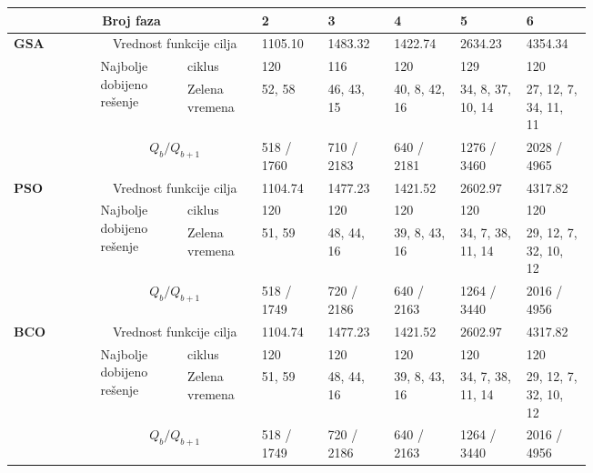 \begin{table*}
    \begin{center}
      \begin{tabular}{p{0.12\linewidth}p{0.12\linewidth}p{0.1\linewidth}p{0.08\linewidth}p{0.08\linewidth}p{0.08\linewidth}p{0.08\linewidth}p{0.08\linewidth}}
        \hline 
        \multicolumn{3}{c}{Broj faza} & 2 & 3 & 4 & 5 & 6 \\ 
        \hline 
        \multirow{4}{4em}{\textbf{GSA}} & \multicolumn{2}{c}{Vrednost funkcije cilja}                    
        & 1105.10 & 1483.32 & 1422.74 & 2634.23 & 4354.34 \\
        \cmidrule{2-8}
        & \multirow{2}{0.9\linewidth}{Najbolje dobijeno rešenje} & ciklus 
        & 120 & 116 & 120 & 129 & 120 \\
                               \cmidrule{3-8}
                               &  & Zelena vremena   
        &  52, 58 &   46, 43, 15 & 40, 8, 42, 16 & 34, 8, 37, 10, 14 & 27, 12, 7, 34, 11, 11 \\
        \cmidrule{2-8}
        & \multicolumn{2}{c}{$ Q_b / Q_{b+1}$} 
        & 518 / 1760 & 710 / 2183 & 640 / 2181 & 1276 / 3460 & 2028 / 4965 \\
        
        \hline
        \multirow{4}{4em}{\textbf{PSO}} & \multicolumn{2}{c}{Vrednost funkcije cilja}                    
        & 1104.74 & 1477.23 & 1421.52 & 2602.97 & 4317.82 \\
        \cmidrule{2-8}
        & \multirow{2}{0.9\linewidth}{Najbolje dobijeno rešenje} & ciklus 
        & 120 & 120 & 120 & 120 & 120 \\ 
                               \cmidrule{3-8}
                               &  & Zelena vremena   
        &  51, 59 &   48, 44, 16 & 39, 8, 43, 16 & 34, 7, 38, 11, 14 & 29, 12, 7, 32, 10, 12 \\
        \cmidrule{2-8}
        & \multicolumn{2}{c}{$ Q_b / Q_{b+1}$} 
        & 518 / 1749 & 720 / 2186 & 640 / 2163 & 1264 / 3440 & 2016 / 4956 \\
        \hline
        \multirow{4}{4em}{\textbf{BCO}} & \multicolumn{2}{c}{Vrednost funkcije cilja}                     
        & 1104.74 & 1477.23 & 1421.52 & 2602.97 & 4317.82 \\
        \cmidrule{2-8}
        & \multirow{2}{0.9\linewidth}{Najbolje dobijeno rešenje} & ciklus 
        & 120 & 120 & 120 & 120 & 120 \\ 
                               \cmidrule{3-8}
                               &  & Zelena vremena   
        &  51, 59 &   48, 44, 16 &  39, 8, 43, 16 &  34, 7, 38, 11, 14 &  29, 12, 7, 32, 10, 12 \\
        \cmidrule{2-8}
        & \multicolumn{2}{c}{$ Q_b / Q_{b+1}$} 
        & 518 / 1749 & 720 / 2186 & 640 / 2163 & 1264 / 3440 & 2016 / 4956 \\
      \hline
      \end{tabular}
    \end{center}
  \end{table*}
  
